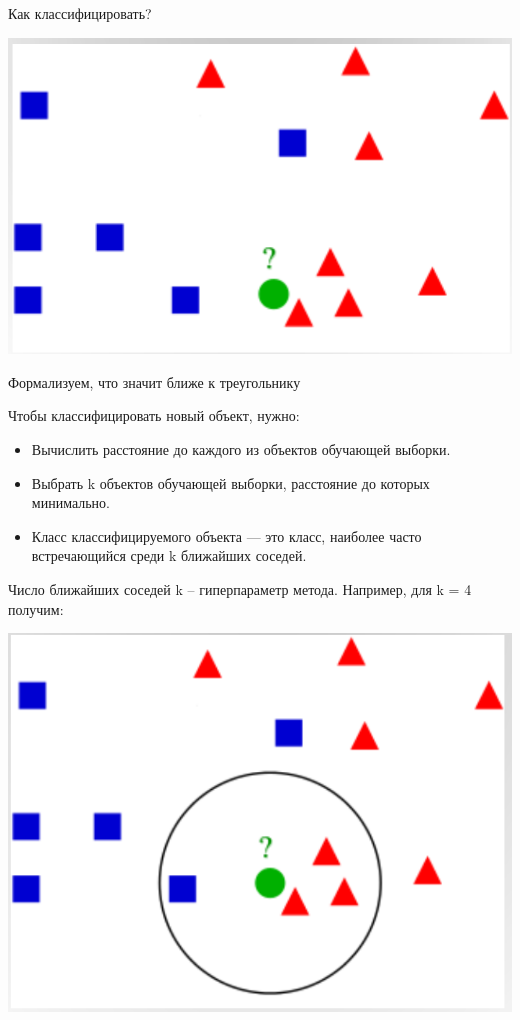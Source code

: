 \documentclass{article}
\begin{document}
Как классифицировать?

\includegraphics[scale=0.3]{nghb.png}

Формализуем, что значит ближе к треугольнику

Чтобы классифицировать новый объект, нужно:
\begin{itemize}
    \item Вычислить расстояние до каждого из объектов обучающей выборки.
    \item Выбрать k объектов обучающей выборки, расстояние до которых минимально.
    \item Класс классифицируемого объекта — это класс, наиболее часто встречающийся среди k ближайших соседей.
\end{itemize}

Число ближайших соседей k – гиперпараметр метода. Например, для k = 4 получим:

\includegraphics[scale=0.3]{sol.png}
\end{document}
